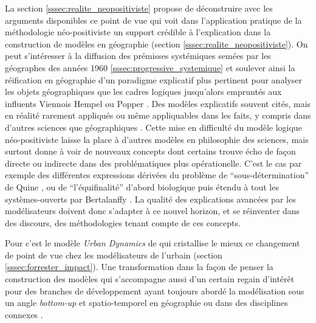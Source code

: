 La section \ref{sssec:realite_neopositiviste} propose de déconstruire avec les arguments disponibles ce point de vue qui voit dans l'application pratique de la méthodologie néo-positiviste un support crédible à l'explication dans la construction de modèles en géographie (section \ref{sssec:realite_neopositiviste}). On peut s'intéresser à la diffusion des prémisses systémiques \autocites{Chorley1962, Berry1964a, Haggett1965,Harvey1969} semées par les géographes des années 1960 \ref{sssec:progressive_systemique} et soulever ainsi la réification en géographie d'un paradigme explicatif plus pertinent pour analyser les objets géographiques que les cadres logiques jusqu'alors empruntés aux influents Viennois Hempel ou Popper \autocite{Besse2000}. Des modèles explicatifs souvent cités, mais en réalité rarement appliqués ou même appliquables dans les faits, y compris dans d'autres sciences que géographiques \autocite{Bechet2013}. Cette mise en difficulté du modèle logique néo-positiviste laisse la place à d'autres modèles en philosophie des sciences, mais surtout donne à voir de nouveaux concepts dont certains trouve écho de façon directe ou indirecte dans des problématiques plus opérationelle. C'est le cas par exemple des différentes expressions dérivées  du problème de \enquote{sous-détermination} de Quine  \autocite{Varenne2014}, ou de \enquote{l'équifinalité} d'abord biologique puis étendu à tout les systèmes-ouverts par Bertalanffy \autocite{Pouvreau2013}. La qualité des explications avancées par les modélisateurs doivent donc s'adapter à ce nouvel horizon, et se réinventer dans des discours, des méthodologies tenant compte de ces concepts.


Pour \textcites{Batty2001, Batty2005b} c'est le modèle \textit{Urban Dynamics} de \textcite{Forrester1969} qui cristallise le mieux ce changement de point de vue chez les modélisateurs de l'urbain (section \ref{sssec:forrester_impact}). Une transformation dans la façon de penser la construction des modèles qui s'accompagne aussi d'un certain regain d'intérêt \autocite{Batty1976} pour des branches de développement ayant toujours abordé la modélisation sous un angle \textit{bottom-up} et spatio-temporel en géographie \autocites{Hagerstrand1952, Hagerstrand1967, Morrill1965, Morrill1965b, Marble1972, Ward1973}  ou dans des disciplines connexes \autocite{Orcutt1957}.

